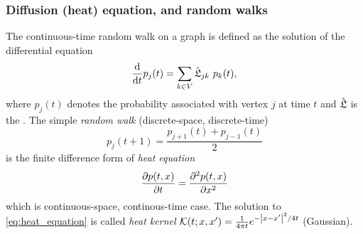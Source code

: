\subsubsection{Diffusion (heat) equation, and random walks}
The continuous-time random walk on a graph is defined as the solution of the differential equation
\begin{equation}
	\dv{t} p_j(t)
	=
	\sum_{k\in V} \hat{\mathfrak{L}}_{jk} \ p_k(t),
	\label{eq:continuous_time_random_walk}
\end{equation}
where $p_j(t)$ denotes the probability associated with vertex $j$ at time $t$
and $\hat{\mathfrak{L}}$ is the .
The simple \emph{random walk} (discrete-space, discrete-time)
\begin{equation}
	p_j(t+1) = \frac{p_{j+1}(t) + p_{j-1}(t)}{2} 
	\label{eq:simple_random_walk}
\end{equation}
is the finite difference form of \emph{heat equation} 
\begin{equation}
	\pdv{p(t,x)}{t} = \pdv{ ^2 p(t,x)}{x^2}
	\label{eq:heat_equation}
\end{equation}
which is continuous-space, continous-time case.
The solution to \cref{eq:heat_equation} is called \emph{heat kernel} $\mathcal{K}(t;x,x')=\frac{1}{4\pi t} e^{-\abs{x-x'}^2/4t}$ (Gaussian).


